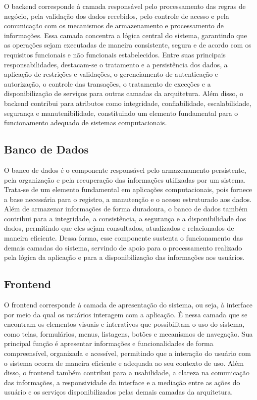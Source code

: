 O backend corresponde à camada responsável pelo processamento das regras de negócio, pela validação dos dados recebidos, pelo controle de acesso e pela comunicação com os mecanismos de armazenamento e processamento de informações. Essa camada concentra a lógica central do sistema, garantindo que as operações sejam executadas de maneira consistente, segura e de acordo com os requisitos funcionais e não funcionais estabelecidos. Entre suas principais responsabilidades, destacam-se o tratamento e a persistência dos dados, a aplicação de restrições e validações, o gerenciamento de autenticação e autorização, o controle das transações, o tratamento de exceções e a disponibilização de serviços para outras camadas da arquitetura. Além disso, o backend contribui para atributos como integridade, confiabilidade, escalabilidade, segurança e manutenibilidade, constituindo um elemento fundamental para o funcionamento adequado de sistemas computacionais.

\subsection{Banco de Dados}

O banco de dados é o componente responsável pelo armazenamento persistente, pela organização e pela recuperação das informações utilizadas por um sistema. Trata-se de um elemento fundamental em aplicações computacionais, pois fornece a base necessária para o registro, a manutenção e o acesso estruturado aos dados. Além de armazenar informações de forma duradoura, o banco de dados também contribui para a integridade, a consistência, a segurança e a disponibilidade dos dados, permitindo que eles sejam consultados, atualizados e relacionados de maneira eficiente. Dessa forma, esse componente sustenta o funcionamento das demais camadas do sistema, servindo de apoio para o processamento realizado pela lógica da aplicação e para a disponibilização das informações aos usuários.


\subsection{Frontend}

O frontend corresponde à camada de apresentação do sistema, ou seja, à interface por meio da qual os usuários interagem com a aplicação. É nessa camada que se encontram os elementos visuais e interativos que possibilitam o uso do sistema, como telas, formulários, menus, listagens, botões e mecanismos de navegação. Sua principal função é apresentar informações e funcionalidades de forma compreensível, organizada e acessível, permitindo que a interação do usuário com o sistema ocorra de maneira eficiente e adequada ao seu contexto de uso. Além disso, o frontend também contribui para a usabilidade, a clareza na comunicação das informações, a responsividade da interface e a mediação entre as ações do usuário e os serviços disponibilizados pelas demais camadas da arquitetura.

